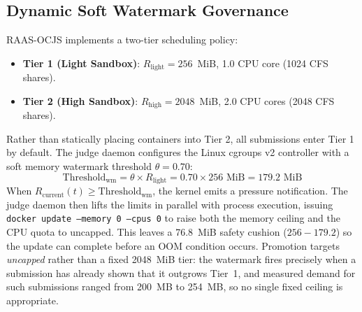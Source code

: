 \documentclass[conference]{IEEEtran}
\begin{document}
\subsection{Dynamic Soft Watermark Governance}
RAAS-OCJS implements a two-tier scheduling policy:
\begin{itemize}
    \item \textbf{Tier 1 (Light Sandbox)}: $R_{\mathrm{light}} = 256$~MiB, 1.0 CPU core (1024 CFS shares).
    \item \textbf{Tier 2 (High Sandbox)}: $R_{\mathrm{high}} = 2048$~MiB, 2.0 CPU cores (2048 CFS shares).
\end{itemize}
Rather than statically placing containers into Tier 2, all submissions enter Tier 1 by default. The judge daemon configures the Linux cgroups v2 controller with a soft memory watermark threshold $\theta = 0.70$:
\begin{equation}
\mathrm{Threshold}_{\mathrm{wm}} = \theta \times R_{\mathrm{light}} = 0.70 \times 256\text{ MiB} = 179.2\text{ MiB}
\end{equation}
When $R_{\mathrm{current}}(t) \ge \mathrm{Threshold}_{\mathrm{wm}}$, the kernel emits a pressure notification. The judge daemon then lifts the limits in parallel with process execution, issuing \texttt{docker update --memory 0 --cpus 0} to raise both the memory ceiling and the CPU quota to uncapped. This leaves a 76.8~MiB safety cushion ($256 - 179.2$) so the update can complete before an OOM condition occurs. Promotion targets \emph{uncapped} rather than a fixed 2048~MiB tier: the watermark fires precisely when a submission has already shown that it outgrows Tier~1, and measured demand for such submissions ranged from 200~MB to 254~MB, so no single fixed ceiling is appropriate.
\end{document}
